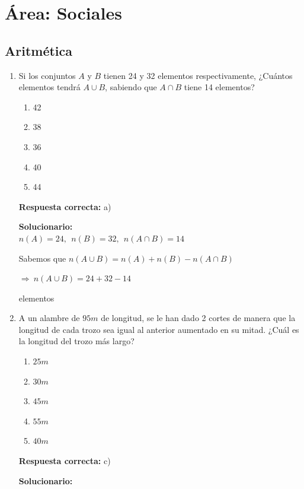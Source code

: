 \section*{Área: Sociales}

\subsection*{Aritmética}

\begin{enumerate}
	
	\item Si los conjuntos $A$ y $B$ tienen 24 y 32 elementos respectivamente, ¿Cuántos elementos tendrá $A\cup B$, sabiendo que $A\cap B$ tiene 14 elementos?
	\begin{enumerate}[label=\alph*)]
		\item 42
		\item 38
		\item 36
		\item 40
		\item 44
	\end{enumerate}
	\textbf{Respuesta correcta:} a)
	
	\vspace{2mm}
	\textbf{Solucionario:}\\
	
	$n(A)=24,\ \ n(B)=32,\ \ n(A\cap B)=14$
	
	Sabemos que $n(A\cup B)=n(A)+n(B)-n(A\cap B)$
	
	$\Rightarrow\ n(A\cup B)=24+32-14$
	
	 elementos
	
	\vspace{6mm}
	
	\item A un alambre de $95m$ de longitud, se le han dado 2 cortes de manera que la longitud de cada trozo sea igual al anterior aumentado en su mitad. ¿Cuál es la longitud del trozo más largo?
	\begin{enumerate}[label=\alph*)]
		\item $25m$
		\item $30m$
		\item $45m$
		\item $55m$
		\item $40m$
	\end{enumerate}
	\textbf{Respuesta correcta:} c)
	
	\vspace{2mm}
	\textbf{Solucionario:}\\
	

\end{enumerate}

